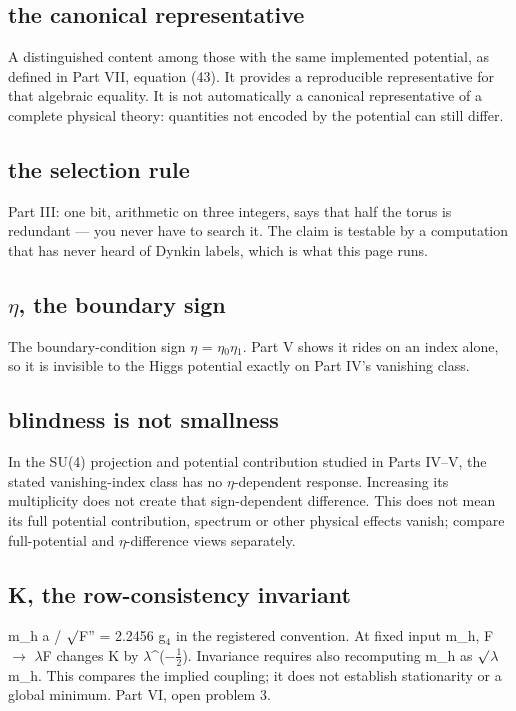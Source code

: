 \documentclass[11pt,a4paper]{article}
\begin{document}
\subsection*{the canonical representative}
A distinguished content among those with the same implemented potential, as defined in Part VII, equation (43). It provides a reproducible representative for that algebraic equality. It is not automatically a canonical representative of a complete physical theory: quantities not encoded by the potential can still differ.

\subsection*{the selection rule}
Part III: one bit, arithmetic on three integers, says that half the torus is redundant --- you never have to search it. The claim is testable by a computation that has never heard of Dynkin labels, which is what this page runs.

\subsection*{\ensuremath{\eta}, the boundary sign}
The boundary-condition sign \ensuremath{\eta} = \ensuremath{\eta}\ensuremath{{}_{0}}\ensuremath{\eta}\ensuremath{{}_{1}}. Part V shows it rides on an index alone, so it is invisible to the Higgs potential exactly on Part IV's vanishing class.

\subsection*{blindness is not smallness}
In the SU(4) projection and potential contribution studied in Parts IV--V, the stated vanishing-index class has no \ensuremath{\eta}-dependent response. Increasing its multiplicity does not create that sign-dependent difference. This does not mean its full potential contribution, spectrum or other physical effects vanish; compare full-potential and \ensuremath{\eta}-difference views separately.

\subsection*{K, the row-consistency invariant}
m\_h a / \ensuremath{\surd}F'' = 2.2456 g\ensuremath{{}_{4}} in the registered convention. At fixed input m\_h, F \ensuremath{\rightarrow} \ensuremath{\lambda}F changes K by \ensuremath{\lambda}\textasciicircum{}(\ensuremath{-}\ensuremath{\frac{1}{2}}). Invariance requires also recomputing m\_h as \ensuremath{\surd}\ensuremath{\lambda} m\_h. This compares the implied coupling; it does not establish stationarity or a global minimum. Part VI, open problem 3.
\end{document}
